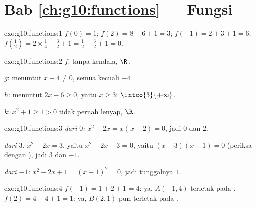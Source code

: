 \section*{Bab \ref{ch:g10:functions} --- Fungsi}

\begin{solution}{exo:g10:functions:1}
$f(0) = 1$; \quad $f(2) = 8 - 6 + 1 = 3$; \quad
$f(-1) = 2 + 3 + 1 = 6$; \quad
$f\!\left(\tfrac12\right) = 2 \times \tfrac14 - \tfrac32 + 1 = \tfrac12 -
\tfrac32 + 1 = 0$.
\end{solution}

\begin{solution}{exo:g10:functions:2}
$f$: tanpa kendala,  $\R$.

$g$: menuntut $x + 4 \neq 0$,  semua  kecuali $-4$.

$h$: menuntut $2x - 6 \geq 0$, yaitu $x \geq 3$: 
$\intco{3}{+\infty}$.

$k$: $x^2 + 1 \geq 1 > 0$ tidak pernah lenyap,  $\R$.
\end{solution}

\begin{solution}{exo:g10:functions:3}
\emph{ dari $0$:} $x^2 - 2x = x(x-2) = 0$, jadi $0$ dan $2$.

\emph{ dari $3$:} $x^2 - 2x = 3$, yaitu $x^2 - 2x - 3 = 0$, yaitu
$(x-3)(x+1) = 0$ (periksa dengan ), jadi $3$ dan $-1$.

\emph{ dari $-1$:} $x^2 - 2x + 1 = (x - 1)^2 = 0$, jadi 
tunggalnya $1$.
\end{solution}

\begin{solution}{exo:g10:functions:4}
$f(-1) = 1 + 2 + 1 = 4$: ya, $A(-1, 4)$ terletak pada .
$f(2) = 4 - 4 + 1 = 1$: ya, $B(2, 1)$ pun terletak pada .
\end{solution}

